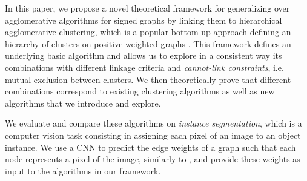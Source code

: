 
In this paper, we propose a novel theoretical framework for generalizing over agglomerative algorithms for signed graphs by linking them to hierarchical agglomerative clustering, which is a popular bottom-up approach defining an hierarchy of clusters on positive-weighted graphs \cite{lance1967general}. This framework defines an underlying basic algorithm and allows us to explore in a consistent way its combinations with different linkage criteria and \emph{cannot-link constraints}, i.e. mutual exclusion between clusters. We then theoretically prove that different combinations correspond to existing clustering algorithms as well as new algorithms that we introduce and explore. %

We evaluate and compare these algorithms on \emph{instance segmentation}, which is a computer vision task consisting in assigning each pixel of an image to an object instance. %
We use a CNN to predict the edge weights of a graph such that each node represents a pixel of the image, similarly to \cite{liu2018affinity,lee2017superhuman,wolf2018mutex}, and provide these weights as input to the algorithms in our framework.

